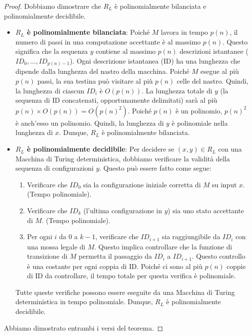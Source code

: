 \documentclass[a4paper, 11pt]{book} %
\theoremstyle{definition}
\begin{document}
\begin{proof}
Dobbiamo dimostrare che $R_L$ è polinomialmente bilanciata e polinomialmente decidibile.

\begin{itemize}
    \item \textbf{$R_L$ è polinomialmente bilanciata}:
    Poiché $M$ lavora in tempo $p(n)$, il numero di passi in una computazione accettante è al massimo $p(n)$. Questo significa che la sequenza $y$ contiene al massimo $p(n)$ descrizioni istantanee ($ID_0, \dots, ID_{p(n)-1}$).
    Ogni descrizione istantanea (ID) ha una lunghezza che dipende dalla lunghezza del nastro della macchina. Poiché $M$ esegue al più $p(n)$ passi, la sua testina può visitare al più $p(n)$ celle del nastro. Quindi, la lunghezza di ciascun $ID_i$ è $O(p(n))$.
    La lunghezza totale di $y$ (la sequenza di ID concatenati, opportunamente delimitati) sarà al più $p(n) \times O(p(n)) = O(p(n)^2)$. Poiché $p(n)$ è un polinomio, $p(n)^2$ è anch'esso un polinomio. Quindi, la lunghezza di $y$ è polinomiale nella lunghezza di $x$. Dunque, $R_L$ è polinomialmente bilanciata.

    \item \textbf{$R_L$ è polinomialmente decidibile}:
    Per decidere se $(x, y) \in R_L$ con una Macchina di Turing deterministica, dobbiamo verificare la validità della sequenza di configurazioni $y$. Questo può essere fatto come segue:
    \begin{enumerate}
        \item Verificare che $ID_0$ sia la configurazione iniziale corretta di $M$ su input $x$. (Tempo polinomiale).
        \item Verificare che $ID_k$ (l'ultima configurazione in $y$) sia uno stato accettante di $M$. (Tempo polinomiale).
        \item Per ogni $i$ da $0$ a $k-1$, verificare che $ID_{i+1}$ sia raggiungibile da $ID_i$ con una mossa legale di $M$. Questo implica controllare che la funzione di transizione di $M$ permetta il passaggio da $ID_i$ a $ID_{i+1}$. Questo controllo è una costante per ogni coppia di ID. Poiché ci sono al più $p(n)$ coppie di ID da controllare, il tempo totale per questa verifica è polinomiale.
    \end{enumerate}
    Tutte queste verifiche possono essere eseguite da una Macchina di Turing deterministica in tempo polinomiale. Dunque, $R_L$ è polinomialmente decidibile.
\end{itemize}
Abbiamo dimostrato entrambi i versi del teorema.
\end{proof}
\end{document}
